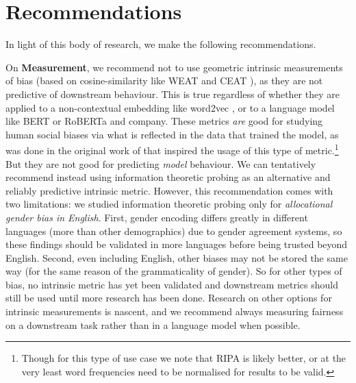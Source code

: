 \section{Recommendations}
In light of this body of research, we make the following recommendations. 

On \textbf{Measurement}, we recommend not to use geometric intrinsic measurements of bias (based on cosine-similarity like WEAT \citep{} and CEAT \citep{}), as they are not predictive of downstream behaviour. This is true regardless of whether they are applied to a non-contextual embedding like word2vec \citep{}, or to a language model like BERT \citep{} or RoBERTa \citep{} and company. These metrics \textit{are} good for studying human social biases via what is reflected in the data that trained the model, as was done in the original work of \citet{Caliskan2017SemanticsDA} that inspired the usage of this type of metric.\footnote{Though for this type of use case we note that RIPA \citep{} is likely better, or at the very least word frequencies need to be normalised for results to be valid.} But they are not good for predicting \textit{model} behaviour. We can tentatively recommend instead using information theoretic probing as an alternative and reliably predictive intrinsic metric. However, this recommendation comes with two limitations: we studied information theoretic probing only for \textit{allocational gender bias in English}. First, gender encoding differs greatly in different languages (more than other demographics) due to gender agreement systems, so these findings should be validated in more languages before being trusted beyond English. Second, even including English, other biases may not be stored the same way (for the same reason of the grammaticality of gender). So for other types of bias, no intrinsic metric has yet been validated and downstream metrics should still be used until more research has been done. Research on other options for intrinsic measurements is nascent, and we recommend always measuring fairness on a downstream task rather than in a language model when possible.
